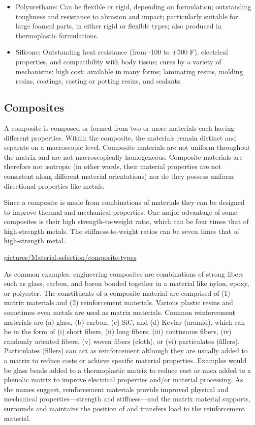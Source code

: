 \documentclass[a4paper,openany,12pt]{book}
\begin{document}
\begin{enumerate}
\begin{itemize}
\item Polyurethane: Can be flexible or rigid, depending on formulation;
outstanding toughness and resistance to abrasion and impact;
particularly suitable for large foamed parts, in either rigid or
flexible types; also produced in thermoplastic formulations.

\item Silicone: Outstanding heat resistance (from -100 to +500 F),
electrical properties, and compatibility with body tissue; cures by a
variety of mechanisms; high cost; available in many forms; laminating
resins, molding resins, coatings, casting or potting resins, and
sealants.
\end{itemize}
\end{enumerate}

\subsection{Composites}
\label{sec:org8e3ebbe}
A composite is composed or formed from two or more materials each having
different properties. Within the composite, the materials remain
distinct and separate on a macroscopic level. Composite materials are
not uniform throughout the matrix and are not macroscopically
homogeneous. Composite materials are therefore not isotropic (in other
words, their material properties are not consistent along different
material orientations) nor do they possess uniform directional
properties like metals.

Since a composite is made from combinations of materials they can be
designed to improve thermal and mechanical properties. One major
advantage of some composites is their high strength-to-weight ratio,
which can be four times that of high-strength metals. The
stiffness-to-weight ratios can be seven times that of high-strength
metal.


\url{pictures/Material-selection/composite-types}

As common examples, engineering composites are combinations of strong
fibers such as glass, carbon, and boron bonded together in a material
like nylon, epoxy, or polyester. The constituents of a composite
material are comprised of (1) matrix materials and (2) reinforcement
materials. Various plastic resins and sometimes even metals are used as
matrix materials. Common reinforcement materials are (a) glass, (b)
carbon, (c) SiC, and (d) Kevlar (aramid), which can be in the form of
(i) short fibers, (ii) long fibers, (iii) continuous fibers, (iv)
randomly oriented fibers, (v) woven fibers (cloth), or (vi) particulates
(fillers). Particulates (fillers) can act as reinforcement although they
are usually added to a matrix to reduce costs or achieve specific
material properties. Examples would be glass beads added to a
thermoplastic matrix to reduce cost or mica added to a phenolic matrix
to improve electrical properties and/or material processing. As the
names suggest, reinforcement materials provide improved physical and
mechanical properties---strength and stiffness---and the matrix material
supports, surrounds and maintains the position of and transfers load to
the reinforcement material.
\end{document}
